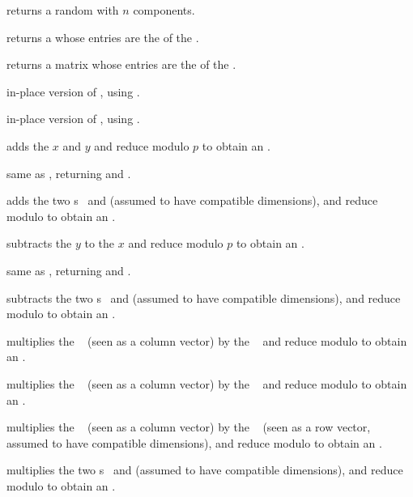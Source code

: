 returns a random  with $n$
components.

 returns a  whose
entries are the  of the .

 returns a matrix whose
entries are the  of the .

in-place version of , using .

in-place version of , using .

 adds the  $x$ and $y$
and reduce modulo $p$ to obtain an .

 same as , returning and
.

 adds the two s~
and  (assumed to have compatible dimensions), and reduce modulo
 to obtain an .

 subtracts the  $y$ to
the  $x$ and reduce modulo $p$ to obtain an .

 same as , returning and
.

 subtracts the two s~
and  (assumed to have compatible dimensions), and reduce modulo
 to obtain an .

 multiplies the ~
(seen as a column vector) by the ~ and reduce modulo  to
obtain an .

 multiplies the ~
(seen as a column vector) by the ~ and reduce modulo  to
obtain an .

 multiplies the ~
(seen as a column vector) by the ~ (seen as a row vector,
assumed to have compatible dimensions), and reduce modulo  to obtain
an .

 multiplies the two s~
and  (assumed to have compatible dimensions), and reduce modulo
 to obtain an .

